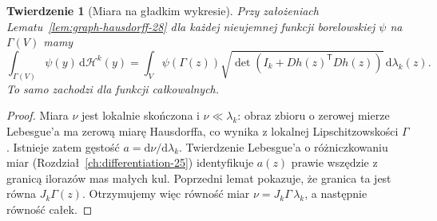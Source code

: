 \documentclass[11pt,a4paper,oneside]{book}
\numberwithin{equation}{chapter}
\theoremstyle{plain}
\newtheorem{twierdzenie}{Twierdzenie}[chapter]
\theoremstyle{definition}
\theoremstyle{remark}
\begin{document}
\begin{twierdzenie}[Miara na gładkim wykresie]
\label{thm:graph-area-28}
Przy założeniach Lematu~\ref{lem:graph-hausdorff-28}
dla każdej nieujemnej funkcji borelowskiej
$\psi$ na $\Gamma(V)$ mamy
\[
 \int_{\Gamma(V)}\psi(y)\,\mathrm d\mathcal H^k(y)
 =\int_V\psi(\Gamma(z))
 \sqrt{\det(I_k+Dh(z)^{\mathsf T}Dh(z))}
 \,\mathrm d\lambda_k(z).
\]
To samo zachodzi dla funkcji całkowalnych.
\end{twierdzenie}
\begin{proof}
Miara $\nu$ jest lokalnie skończona i
$\nu\ll\lambda_k$: obraz zbioru o zerowej
mierze Lebesgue'a ma zerową miarę Hausdorffa,
co wynika z lokalnej Lipschitzowskości $\Gamma$.
Istnieje zatem gęstość $a=\mathrm d\nu/\mathrm d\lambda_k$.
Twierdzenie Lebesgue'a o różniczkowaniu miar
(Rozdział~\ref{ch:differentiation-25})
identyfikuje $a(z)$ prawie wszędzie z granicą
ilorazów mas małych kul. Poprzedni lemat
pokazuje, że granica ta jest równa $J_k\Gamma(z)$.
Otrzymujemy więc równość miar
$\nu=J_k\Gamma\,\lambda_k$, a następnie
równość całek.
\end{proof}
\end{document}
